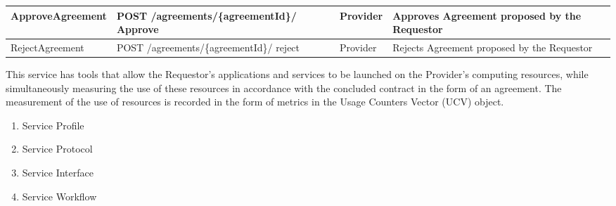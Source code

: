 \begin{enumerate}
\begin{enumerate}
\begin{table}
\begin{center}
\begin{tabular}{|p{3cm}|p{7cm}|p{1.5cm}|p{4cm}|}
ApproveAgreement	& POST /agreements/\{agreementId\}/ \newline Approve			& Provider	&	Approves Agreement proposed by the Requestor \\
\hline

RejectAgreement		& POST /agreements/\{agreementId\}/ \newline reject				& Provider	&	Rejects Agreement proposed by the Requestor	\\
\hline

\end{tabular}
\end{center}

\end{table}

\end{enumerate}

\end{enumerate}



This service has tools that allow the Requestor's applications and services to be launched on the Provider's computing resources,
while simultaneously measuring the use of these resources in accordance with the concluded contract in the form of an agreement. 
The measurement of the use of resources is recorded in the form of metrics in the Usage Counters Vector (UCV) object.


\begin{enumerate}
    \item Service Profile
    \item Service Protocol
    \item Service Interface
    \item Service Workflow
\end{enumerate}


